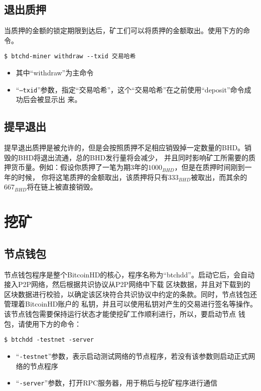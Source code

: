 \subsection{退出质押}
\begin{flushleft}
    当质押的金额的锁定期限到达后，矿工们可以将质押的金额取出。使用下方的命令。
\end{flushleft}
\scriptsize
\begin{verbatim}
$ btchd-miner withdraw --txid 交易哈希
\end{verbatim}
\normalsize
\begin{itemize}
    \item 其中``withdraw''为主命令
    \item ``\texttt{--txid}''参数，指定``交易哈希''，这个``交易哈希''在之前使用``deposit''命令成功后会被显示出
        来。
\end{itemize}
\subsection{提早退出}
\begin{flushleft}
    提早退出质押是被允许的，但是会按照质押不足相应销毁掉一定数量的BHD。销毁的BHD将退出流通，总的BHD发行量将会减少，
    并且同时影响矿工所需要的质押货币量。例如：假设你质押了一笔为期3年的$1000_{BHD}$，但是在质押时间刚到一年的时候，
    你将这笔质押的金额取出，该质押将只有$333_{BHD}$被取出，而其余的$667_{BHD}$将在链上被直接销毁。
\end{flushleft}
\section{挖矿}
\subsection{节点钱包}
\begin{flushleft}
    节点钱包程序是整个BitcoinHD的核心，程序名称为``btchdd''。启动它后，会自动接入P2P网络，然后根据共识协议从P2P网络中下载
    区块数据，并且对下载到的区块数据进行校验，以确定该区块符合共识协议中约定的条款。同时，节点钱包还管理着BitcoinHD账户的
    私钥，并且可以使用私钥对产生的交易进行签名等操作。该节点钱包需要保持运行状态才能使挖矿工作顺利进行，所以，要启动节点
    钱包，请使用下方的命令：
\end{flushleft}
\scriptsize
\begin{verbatim}
$ btchdd -testnet -server
\end{verbatim}
\normalsize
\begin{itemize}
    \item ``\texttt{-testnet}''参数，表示启动测试网络的节点程序，若没有该参数则启动正式网络的节点程序
    \item ``\texttt{-server}''参数，打开RPC服务器，用于稍后与挖矿程序进行通信
\end{itemize}
